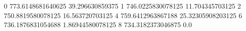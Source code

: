 0 773.6148681640625 39.296630859375
1 746.0225830078125 11.704345703125
2 750.8819580078125 16.563720703125
4 759.6412963867188 25.32305908203125
6 736.1876831054688 1.86944580078125
8 734.3182373046875 0.0
